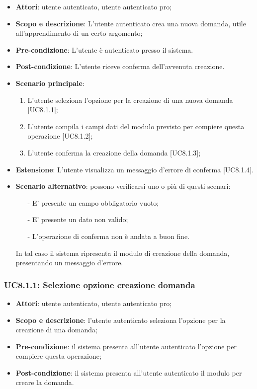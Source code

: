 	\begin{itemize}
		\item
			\textbf{Attori}: utente autenticato, utente autenticato pro;
		\item		
			\textbf{Scopo e descrizione}: L'utente autenticato crea una nuova domanda, utile all'apprendimento di un certo argomento;
		\item
			\textbf{Pre-condizione}: L'utente è autenticato presso il sistema. 
		\item
			\textbf{	Post-condizione}: L'utente riceve conferma dell'avvenuta creazione.		
		\item
			\textbf{Scenario principale}:
	       		\begin{enumerate}
					\item 	
					L'utente seleziona l'opzione per la creazione di una nuova domanda [UC8.1.1];
					\item
					L'utente compila i campi dati del modulo previsto per compiere questa operazione [UC8.1.2];
					\item
					L'utente conferma la creazione della domanda [UC8.1.3];
	 			\end{enumerate}
	 	\item
			\textbf{Estensione}: L'utente visualizza un messaggio d'errore di conferma [UC8.1.4].
	 	\item
	 		\textbf{Scenario alternativo}: possono verificarsi uno o più di questi scenari:
				\begin{itemize}
					\item[-] 	
						E' presente un campo obbligatorio vuoto;
					\item[-] 
    						E' presente un dato non valido;
					\item[-] 
						L'operazione di conferma non è andata a buon fine.
				\end{itemize}
			In tal caso il sistema ripresenta il modulo di creazione della domanda, presentando un messaggio d'errore.
	\end{itemize}
	\subsubsection{UC8.1.1: Selezione opzione creazione domanda}
	\begin{itemize}
		\item
			\textbf{Attori}: utente autenticato, utente autenticato pro;
		\item
			\textbf{Scopo e descrizione}: l'utente autenticato seleziona l'opzione per la creazione di una domanda;
		\item		
			\textbf{Pre-condizione}: il sistema presenta all'utente autenticato l'opzione per compiere questa operazione;
		\item
			\textbf{Post-condizione}: il sistema presenta all'utente autenticato il modulo per creare la domanda.
	\end{itemize}	
